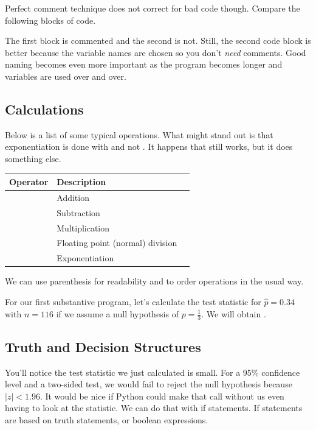 \documentclass{article}
\begin{document}
\noindent Perfect comment technique does not correct for bad code though. Compare the following blocks of code. 



The first block is commented and the second is not. Still, the second code block is better because the variable names are chosen so you don't \emph{need} comments. Good naming becomes even more important as the program becomes longer and variables are used over and over. 



\subsection{Calculations}
Below is a list of some typical operations. What might stand out is that exponentiation is done with \code{**} and not \code{^}. It happens that \code{^} still works, but it does something else. 


\begin{center}
{\setlength{\tabcolsep}{2em}
\begin{tabular}{lll}
\toprule
Operator & Description \\
\midrule
\code{+} &    Addition \\
\code{-} & Subtraction \\
\code{*}  &    Multiplication \\
\code{/}  &   Floating point (normal) division \\
\code{**} & Exponentiation \\
\bottomrule
\end{tabular}}
\end{center}

We can use parenthesis for readability and to order operations in the usual way.


For our first substantive program, let's calculate the test statistic for $\hat{p} = 0.34$ with $n=116$ if we assume a null hypothesis of $p = \frac{1}{3}$. We will obtain .


\subsection{Truth and Decision Structures}

You'll notice the test statistic we just calculated is small. For a 95\% confidence level and a two-sided test, we would fail to reject the null hypothesis because $\vert z \vert < 1.96$. It would be nice if Python could make that call without us even having to look at the statistic. We can do that with if statements. If statements are based on truth statements, or boolean expressions.
\end{document}
